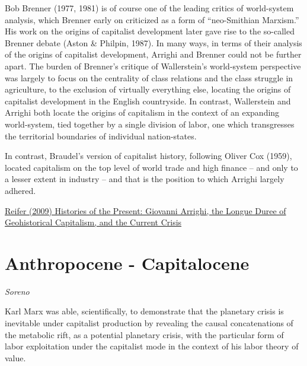\documentclass[
]{book}
\begin{document}
Bob Brenner (1977, 1981) is of course one of the leading critics of world-system analysis, which Brenner early on criticized as a form of ``neo-Smithian Marxism.'' His work on the origins of capitalist development later gave rise to the so-called Brenner debate (Aston \& Philpin, 1987). In many ways, in terms of their analysis of the origins of capitalist development, Arrighi and Brenner could not be further apart. The burden of Brenner's critique of Wallerstein's world-system perspective was largely to focus on the centrality of class relations and the class struggle in agriculture, to the exclusion of virtually everything else, locating the origins of capitalist development in the English countryside. In contrast, Wallerstein and Arrighi both locate the origins of capitalism in the context of an expanding world-system, tied together by a single division of labor, one which transgresses the territorial boundaries of individual nation-states.

In contrast, Braudel's version of capitalist history, following Oliver Cox (1959), located capitalism on the top level of world trade and high finance -- and only to a lesser extent in industry -- and that is the position to which Arrighi largely adhered.

\href{https://www.tni.org/en/article/histories-of-the-present-giovanni-arrighi-the-longue-duree-of-geohistorical-capitalism-and}{Reifer (2009) Histories of the Present: Giovanni Arrighi, the Longue Duree of Geohistorical Capitalism, and the Current Crisis}

\hypertarget{anthropocene---capitalocene}{%
\section{Anthropocene - Capitalocene}\label{anthropocene---capitalocene}}

\emph{Soreno}

Karl Marx was able, scientifically, to demonstrate that the planetary crisis is inevitable under capitalist production by revealing the causal concatenations of the metabolic rift, as a potential planetary crisis, with the particular form of labor exploitation under the capitalist mode in the context of his labor theory of value.
\end{document}
